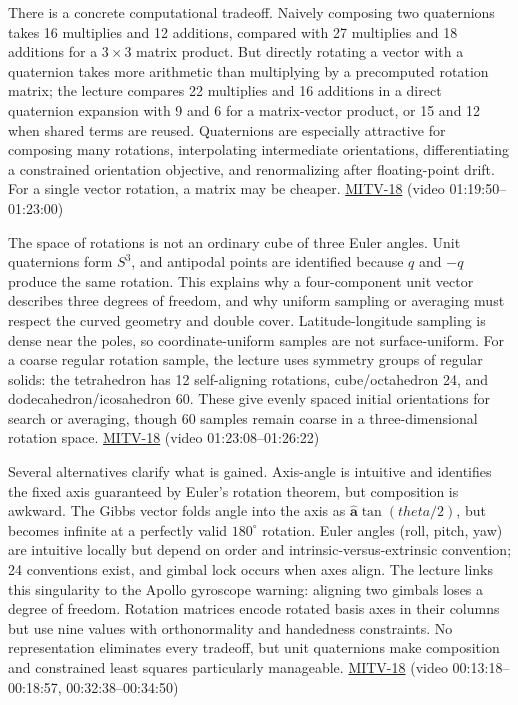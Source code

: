There is a concrete computational tradeoff. Naively composing two quaternions takes 16 multiplies and 12 additions, compared with 27 multiplies and 18 additions for a \(3\times3\) matrix product. But directly rotating a vector with a quaternion takes more arithmetic than multiplying by a precomputed rotation matrix; the lecture compares 22 multiplies and 16 additions in a direct quaternion expansion with 9 and 6 for a matrix-vector product, or 15 and 12 when shared terms are reused. Quaternions are especially attractive for composing many rotations, interpolating intermediate orientations, differentiating a constrained orientation objective, and renormalizing after floating-point drift. For a single vector rotation, a matrix may be cheaper. \hyperref[04-visual-computing-ii-ch036-mitv-18---rotation-and-how-to-represent-it-unit-quaternions-the-space-of-rotations]{MITV-18} (video 01:19:50--01:23:00)

The space of rotations is not an ordinary cube of three Euler angles. Unit quaternions form \(S^3\), and antipodal points are identified because \(q\) and \(-q\) produce the same rotation. This explains why a four-component unit vector describes three degrees of freedom, and why uniform sampling or averaging must respect the curved geometry and double cover. Latitude-longitude sampling is dense near the poles, so coordinate-uniform samples are not surface-uniform. For a coarse regular rotation sample, the lecture uses symmetry groups of regular solids: the tetrahedron has 12 self-aligning rotations, cube/octahedron 24, and dodecahedron/icosahedron 60. These give evenly spaced initial orientations for search or averaging, though 60 samples remain coarse in a three-dimensional rotation space. \hyperref[04-visual-computing-ii-ch036-mitv-18---rotation-and-how-to-represent-it-unit-quaternions-the-space-of-rotations]{MITV-18} (video 01:23:08--01:26:22)

Several alternatives clarify what is gained. Axis-angle is intuitive and identifies the fixed axis guaranteed by Euler's rotation theorem, but composition is awkward. The Gibbs vector folds angle into the axis as \(\hat{\mathbf{a}}\tan(theta/2)\), but becomes infinite at a perfectly valid \(180^\circ\) rotation. Euler angles (roll, pitch, yaw) are intuitive locally but depend on order and intrinsic-versus-extrinsic convention; 24 conventions exist, and gimbal lock occurs when axes align. The lecture links this singularity to the Apollo gyroscope warning: aligning two gimbals loses a degree of freedom. Rotation matrices encode rotated basis axes in their columns but use nine values with orthonormality and handedness constraints. No representation eliminates every tradeoff, but unit quaternions make composition and constrained least squares particularly manageable. \hyperref[04-visual-computing-ii-ch036-mitv-18---rotation-and-how-to-represent-it-unit-quaternions-the-space-of-rotations]{MITV-18} (video 00:13:18--00:18:57, 00:32:38--00:34:50)

